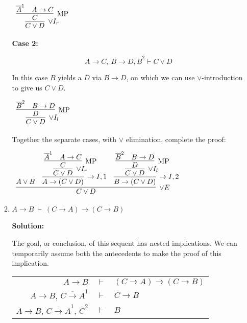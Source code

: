 \documentclass[11pt]{report}
\newcommand{\temp}[2]{{\overline{#2}}^{#1}}
\begin{document}
\begin{enumerate}
\begin{enumerate}
		\begin{center}
			$\begin{array}{c}
				\infer[\lor I_{r}]{C \lor D}
					{\infer[\MP]{C}
						{\temp{1}{A} & A \to C}}
			\end{array}$
		\end{center}

		\textbf{Case 2:}
		
		$$A \to C, \ B \to D, \temp{2}{B} \vdash C \lor D$$

		In this case $B$ yields a $D$ via $B \to D$, on which we can use $\lor$-introduction to give us $C \lor D$. 

		\begin{center}
			$\begin{array}{c}
				\infer[\lor I_{l}]{C \lor D}
					{\infer[\MP]{D}
						{\temp{2}{B} & B \to D}}
			\end{array}$
		\end{center}

		Together the separate cases, with $\lor$ elimination, complete the proof: 

		\begin{center}
			$\begin{array}{c}
				\infer[\lor E]{C \lor D}
					{A \lor B					
						&
					\infer[\to I,1]{A \to (C \lor D)}
						{\infer[\lor I_{r}]{C \lor D}
							{\infer[\MP]{C}
								{\temp{1}{A} & A \to C}}}
						&
					\infer[\to I, 2]{B \to (C \lor D)}
						{\infer[\lor I_{l}]{C \lor D}
							{\infer[\MP]{D}
								{\temp{2}{B} & B \to D}}}
					}				
			\end{array}$
		\end{center}
		

		\vspace{5mm}		
		\newpage
		\item $A \to B \ \vdash \ (C \to A) \to (C \to B)$	
		
		\vspace{5mm}
		\textbf{Solution:}

		The goal, or conclusion, of this sequent has nested implications. We can temporarily assume both the antecedents to make the proof of this implication. 

		\begin{center}
			\begin{tabular}{r c l}
				$A \to B$ & $\vdash$ & $(C \to A) \to (C \to B)$ \\
				$A \to B$, $\temp{1}{C \to A}$ & $\vdash$ & $C \to B$ \\
				$A \to B$, $\temp{1}{C \to A}$, $\temp{2}{C}$ & $\vdash$ & $B$ \\
			\end{tabular}
		\end{center}


\end{enumerate}
\end{enumerate}
\end{document}
